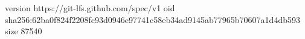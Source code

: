 version https://git-lfs.github.com/spec/v1
oid sha256:62ba0f824f2208fc93d0946e97741c58eb34ad9145ab77965b70607a1d4db593
size 87540
